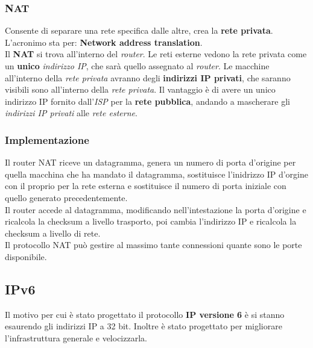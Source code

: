 \subsubsection{NAT}
Consente di separare una rete specifica dalle altre, crea la \textbf{rete privata}. L'acronimo sta per: \textbf{Network address translation}. \\ 
Il \textbf{NAT} si trova all'interno del \textit{router}. Le reti esterne vedono la rete privata come un \textbf{unico} \textit{indirizzo IP}, che sarà quello assegnato al \textit{router}. Le macchine all'interno della \textit{rete privata} avranno degli \textbf{indirizzi IP privati}, che saranno visibili sono all'interno della \textit{rete privata}. 
Il vantaggio è di avere un unico indirizzo IP fornito dall'\textit{ISP} per la \textbf{rete pubblica}, andando a mascherare gli \textit{indirizzi IP privati} alle \textit{rete esterne}. 
\subsubsection*{Implementazione}
Il router NAT riceve un datagramma, genera un numero di porta d'origine per quella macchina che ha mandato il datagramma, sostituisce l'inidrizzo IP d'orgine con il proprio per la rete esterna e sostituisce il numero di porta iniziale con quello generato precedentemente. \\  
Il router accede al datagramma, modificando nell'intestazione la porta d'origine e ricalcola la checksum a livello trasporto, poi cambia l'indirizzo IP e ricalcola la checksum a livello di rete. \\ 
Il protocollo NAT può gestire al massimo tante connessioni quante sono le porte disponibile. 

\subsection{IPv6}
Il motivo per cui è stato progettato il protocollo \textbf{IP versione 6} è si stanno esaurendo gli indirizzi IP a 32 bit. Inoltre è stato progettato per migliorare l'infrastruttura generale e velocizzarla. 
